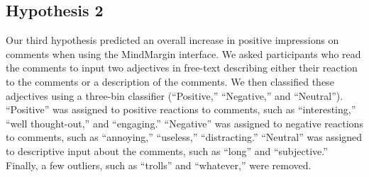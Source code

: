 
\subsection{Hypothesis 2}
Our third hypothesis predicted an overall increase in positive impressions on comments when using the MindMargin interface. We asked participants who read the comments to input two adjectives in free-text describing either their reaction to the comments or a description of the comments. We then classified these adjectives using a three-bin classifier (“Positive,” “Negative,” and “Neutral”). “Positive” was assigned to positive reactions to comments, such as “interesting,” “well thought-out,” and “engaging.” “Negative” was assigned to negative reactions to comments, such as “annoying,” “useless,” “distracting.” “Neutral” was assigned to descriptive input about the comments, such as “long” and “subjective.” Finally, a few outliers, such as “trolls” and “whatever,” were removed. 

